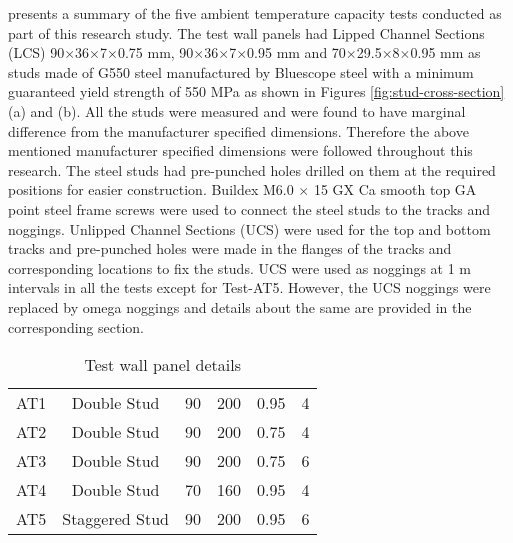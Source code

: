  presents a summary of the five ambient temperature capacity tests conducted as part of this research study. The test wall panels had Lipped Channel Sections (LCS) 90$\times$36$\times$7$\times$0.75 mm, 90$\times$36$\times$7$\times$0.95 mm and 70$\times$29.5$\times$8$\times$0.95 mm as studs made of G550 steel manufactured by Bluescope steel with a minimum guaranteed yield strength of 550 MPa as shown in Figures \ref{fig:stud-cross-section} (a) and (b). All the studs were measured and were found to have marginal difference from the manufacturer specified dimensions. Therefore the above mentioned manufacturer specified dimensions were followed throughout this research. The steel studs had pre-punched holes drilled on them at the required positions for easier construction. Buildex M6.0 $\times$ 15 GX Ca smooth top GA point steel frame screws were used to connect the steel studs to the tracks and noggings. Unlipped Channel Sections (UCS) were used for the top and bottom tracks and pre-punched holes were made in the flanges of the tracks and corresponding locations to fix the studs. UCS were used as noggings at 1 m intervals in all the tests except for Test-AT5. However, the UCS noggings were replaced by omega noggings and details about the same are provided in the corresponding section.
\begin{table}[!htbp]
	\centering
	\caption{Test wall panel details}
	\begin{tabular}{cccccc}
		\toprule
		\multicolumn{1}{m{2.4em}}{\centering{Test Name}} & 
		\multicolumn{1}{m{5.6em}}{\centering{Description}} & 
		\multicolumn{1}{m{2.85em}}{\centering{Stud Depth (mm)}} & 
		\multicolumn{1}{m{2.85em}}{\centering{Cavity Depth (mm)}} & 
		\multicolumn{1}{m{5em}}{\centering{Stud Thickness (mm)}} & 
		\multicolumn{1}{m{3em}}{\centering{No of Studs}} \\
		\midrule
		AT1  & Double Stud & 90 & 200 & 0.95 & 4 \\
		AT2  & Double Stud & 90 & 200 & 0.75 & 4 \\
		AT3  & Double Stud & 90 & 200 & 0.75 & 6 \\
		AT4  & Double Stud & 70 & 160 & 0.95 & 4 \\
		AT5  & Staggered Stud & 90 & 200 & 0.95 & 6 \\
		\bottomrule
	\end{tabular}%
	\label{tab:ambient-test-specimens}%
\end{table}%

